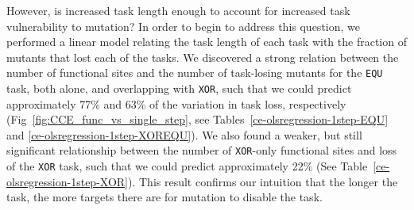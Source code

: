 \documentclass[10pt,letterpaper,final]{article}
\begin{document}
However, is increased task length enough to account for increased task vulnerability to mutation? In order to begin to address this question, we performed a linear model relating the task length of each task with the fraction of mutants that lost each of the tasks. We discovered a strong relation between the number of functional sites and the number of task-losing mutants for the \texttt{EQU} task, both alone, and overlapping with \texttt{XOR}, such that we could predict approximately 77\% and 63\% of the variation in task loss, respectively (Fig~\ref{fig:CCE_func_vs_single_step}, see Tables~\ref{ce-olsregression-1step-EQU} and \ref{ce-olsregression-1step-XOREQU}). We also found a weaker, but still significant relationship between the number of \texttt{XOR}-only functional sites and loss of the \texttt{XOR} task, such that we could predict approximately 22\% (See Table~\ref{ce-olsregression-1step-XOR}). This result confirms our intuition that the longer the task, the more targets there are for mutation to disable the task.
\end{document}
